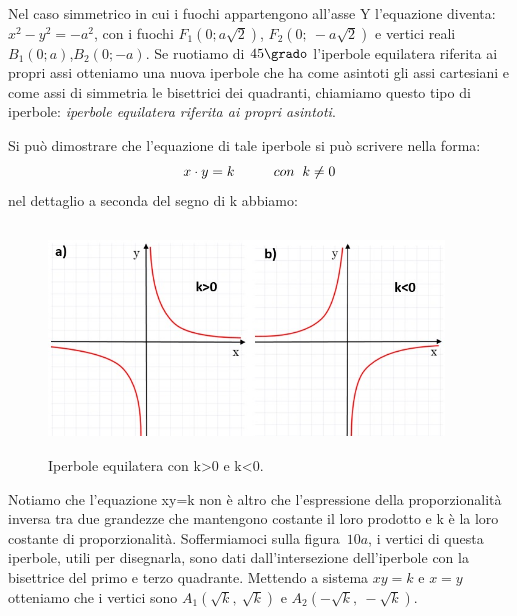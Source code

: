 \vspace{12pt}
Nel caso simmetrico in cui i fuochi appartengono all'asse Y 
l'equazione diventa:\\
$ x^{2} - y^{2} =- a^{2} $, con i fuochi 
$ F_{1} \left(0; a \sqrt{2}\right)$, $ F_{2} \left(0;~-a \sqrt{2}\right)$ 
e vertici reali $ B_{1} (0; a)$,$ B_{2} (0; -a)$.
Se ruotiamo di $45\grado$ l'iperbole equilatera riferita ai propri 
assi otteniamo una nuova iperbole che ha come asintoti gli assi cartesiani 
e come assi di simmetria le bisettrici dei quadranti, chiamiamo questo tipo 
di iperbole: \emph{iperbole equilatera riferita ai propri asintoti}.

Si può dimostrare che l'equazione di tale iperbole si può scrivere nella 
forma: 
\begin{equation}
x\cdot y=k \hspace{1cm} con \hspace{0.2cm}k \neq 0
\end{equation}
nel dettaglio a seconda del segno di k abbiamo: 
\begin{figure}[!h]
  \centering
  \includegraphics[height=6cm, width=10.5cm]{img/equilatera2.jpg}
  \caption{Iperbole equilatera con k>0 e k<0.}
\end{figure}

Notiamo che l'equazione xy=k non è altro che l'espressione della 
proporzionalità inversa tra due grandezze che mantengono costante il loro 
prodotto e k è la loro costante di proporzionalità. Soffermiamoci sulla 
figura~\(10a\), i vertici di questa iperbole, utili per disegnarla, sono dati 
dall'intersezione dell'iperbole con la bisettrice del primo e terzo 
quadrante. Mettendo a sistema \(xy=k\) e \(x=y\) otteniamo che i vertici sono 
$A_{1} \left( \sqrt{k},~\sqrt{k} \right)$ e 
$A_{2} \left(- \sqrt{k},~-\sqrt{k} \right)$.

